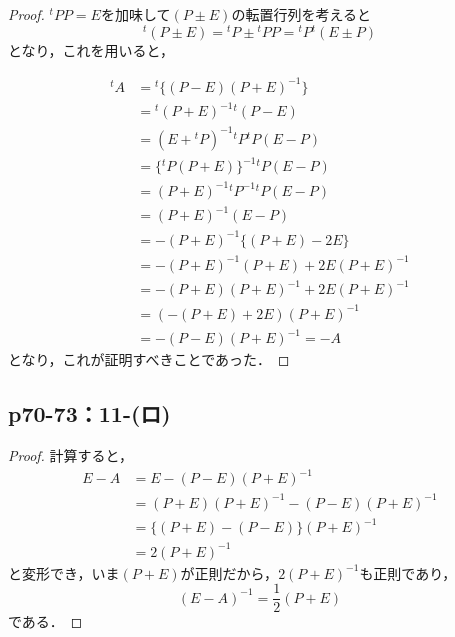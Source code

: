 \documentclass[a4paper,10pt,fleqn]{ltjsarticle}
\begin{document}
\begin{tleftbar}
    \begin{proof}
        ${}^t PP =E$を加味して$(P \pm E)$の転置行列を考えると
        \[
            {}^t (P \pm E) = {}^t P \pm {}^t PP = {}^t P {}^t (E \pm P)
        \]
        となり，これを用いると，

        \begin{align*}
            {}^t A & ={}^t  \{ (P-E)(P+E)^{-1} \}            \\
                   & = {}^t (P+E)^{-1} {}^t (P-E)            \\
                   & = (E+{}^t P)^{-1} {}^t P {}^t P (E-P)   \\
                   & = \{ {}^t P (P+E)  \}^{-1} {}^t P (E-P) \\
                   & = (P+E)^{-1} {}^t P^{-1} {}^t P (E-P)   \\
                   & = (P+E)^{-1} (E-P)                      \\
                   & = -(P+E)^{-1} \{ (P+E)-2E \}            \\
                   & = -(P+E)^{-1} (P+E) +2E (P+E)^{-1}      \\
                   & = -(P+E) (P+E)^{-1} +2E (P+E)^{-1}      \\
                   & = (-(P+E)+2E) (P+E)^{-1}                \\
                   & = -(P-E) (P+E)^{-1} = -A
        \end{align*}
        となり，これが証明すべきことであった．
    \end{proof}
\end{tleftbar}


\subsection*{p70-73：11-(ロ)}

\begin{tleftbar}
    \begin{proof}

        計算すると，
        \begin{align*}
            E-A & = E-(P-E) (P+E)^{-1}                 \\
                & = (P+E)(P+E)^{-1} - (P-E) (P+E)^{-1} \\
                & = \{ (P+E)-(P-E) \} (P+E)^{-1}       \\
                & = 2(P+E)^{-1}
        \end{align*}
        と変形でき，いま$(P+E)$が正則だから，$2(P+E)^{-1}$も正則であり，
        \[
            (E-A)^{-1} = \frac{1}{2} (P+E)
        \]
        である．
    \end{proof}
\end{tleftbar}
\end{document}
